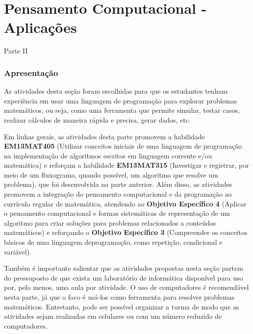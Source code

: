 \renewcommand\chapterwhat{Aplicações do pensamento computacional e de linguagens de programação na exploração de problemas matemáticos.}
\renewcommand\chapterbecause{Dominar uma linguagem de programação nos permite explorar e resolver problemas matemáticos de maneiras diferentes. Assim, podemos entender o poder de ferramentas computacionais e porque elas são tão usadas em todas as áreas do conhecimento atualmente.} 
\chapter{Pensamento Computacional - Aplicações}
\label{computacional-chap2}
\mbox{}\thispagestyle{empty}\clearpage


\begin{paginatexto}{Parte II}

\subsection{Apresentação}
As atividades desta seção foram escolhidas para que os estudantes tenham experiência em usar uma linguagem de programação para explorar problemas matemáticos, ou seja, como uma ferramenta que permite simular, testar casos, realizar cálculos de maneira rápida e precisa, gerar dados, etc.

Em linhas gerais, as atividades desta parte promovem a habilidade \textbf{EM13MAT405} (Utilizar conceitos iniciais de uma linguagem de programação na implementação de algoritmos escritos em linguagem corrente e/ou matemática) e reforçam a habilidade \textbf{EM13MAT315} (Investigar e registrar, por meio de um fluxograma, quando possível, um algoritmo que resolve um problema), que foi desenvolvida na parte anterior. Além disso, as atividades promovem a integração do pensamento computacional e da programação ao currículo regular de matemática, atendendo ao \textbf{Objetivo Específico 4} (Aplicar o pensamento computacional e formas sistemáticas de representação de um algoritmo para criar soluções para problemas relacionados a conteúdos matemáticos) e reforçando o \textbf{Objetivo Específico 3} (Compreender os conceitos básicos de uma linguagem deprogramação, como repetição, condicional e variável).

Também é importante salientar que as atividades propostas nesta seção partem do pressuposto de que exista um laboratório de informática disponível para uso por, pelo menos, uma aula por atividade. O uso de computadores é recomendável nesta parte, já que o foco é usá-los como ferramenta para resolver problemas matemáticos. Entretanto, pode ser possível organizar a turma de modo que as atividades sejam realizadas em celulares ou com um número reduzido de computadores.


\end{paginatexto}
